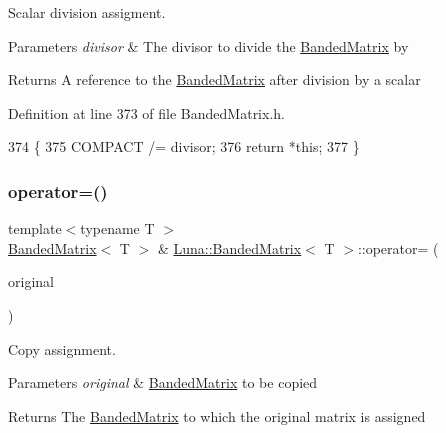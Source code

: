 Scalar division assigment. 


\begin{DoxyParams}{Parameters}
{\em divisor} & The divisor to divide the \hyperlink{classLuna_1_1BandedMatrix}{Banded\+Matrix} by \\
\hline
\end{DoxyParams}
\begin{DoxyReturn}{Returns}
A reference to the \hyperlink{classLuna_1_1BandedMatrix}{Banded\+Matrix} after division by a scalar 
\end{DoxyReturn}


Definition at line 373 of file Banded\+Matrix.\+h.


\begin{DoxyCode}
374   \{
375     COMPACT /= divisor;
376     \textcolor{keywordflow}{return} *\textcolor{keyword}{this};
377   \}
\end{DoxyCode}
\mbox{\label{classLuna_1_1BandedMatrix_a25ca62173e2ad70df640482546b276df}} 
\subsubsection{\texorpdfstring{operator=()}{operator=()}}
{\footnotesize\ttfamily template$<$typename T $>$ \\
\hyperlink{classLuna_1_1BandedMatrix}{Banded\+Matrix}$<$ T $>$ \& \hyperlink{classLuna_1_1BandedMatrix}{Luna\+::\+Banded\+Matrix}$<$ T $>$\+::operator= (\begin{DoxyParamCaption}\item[{const \hyperlink{classLuna_1_1BandedMatrix}{Banded\+Matrix}$<$ T $>$ \&}]{original }\end{DoxyParamCaption})\hspace{0.3cm}{\ttfamily [inline]}}



Copy assignment. 


\begin{DoxyParams}{Parameters}
{\em original} & \hyperlink{classLuna_1_1BandedMatrix}{Banded\+Matrix} to be copied \\
\hline
\end{DoxyParams}
\begin{DoxyReturn}{Returns}
The \hyperlink{classLuna_1_1BandedMatrix}{Banded\+Matrix} to which the original matrix is assigned 
\end{DoxyReturn}



